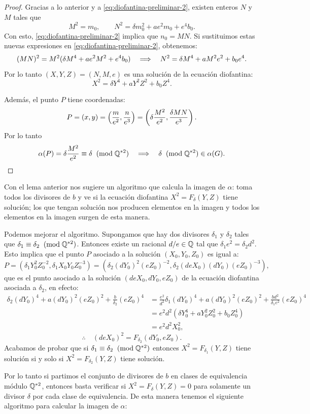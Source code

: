 \documentclass[../../tesis_maestria]{subfiles}
\begin{document}
\begin{proof}
Gracias a lo anterior y a \eqref{eq:diofantina-preliminar-2}, existen enteros $N$ y $M$ tales que
\[
	M^2=m_0,\qquad N^2=\delta m_0^2+ae^2m_0+e^4b_0.
\]
Con esto, \eqref{eq:diofantina-preliminar-2} implica que $n_0=MN$. Si sustituimos estas nuevas expresiones en \eqref{eq:diofantina-preliminar-2}, obtenemos:
\[
	(MN)^2=M^2(\delta M^4+ae^2M^2+e^4b_0)\quad\Longrightarrow\quad N^2=\delta M^4+aM^2e^2+b_0e^4.
\]
Por lo tanto  $(X,Y,Z)=(N,M,e)$ es una solución de la ecuación diofantina:
\[
	X^2=\delta Y^4+aY^2Z^2+b_0 Z^4.
\]

Además, el punto $P$ tiene coordenadas:
\[
	P=(x,y)=\left( \frac{m}{e^2},\frac{n}{e^3} \right)=\left( \delta\frac{M^2}{e^2},\frac{\delta MN}{e^3} \right).
\]
Por lo tanto
\[
	\alpha(P)=\delta\frac{M^2}{e^2}\equiv \delta\;\;(\mathrm{mod}\; \mathbb{Q}^{*2}) \quad\Longrightarrow\quad \delta\;\;(\mathrm{mod}\; \mathbb{Q}^{*2})\in\alpha(G).
\]
\end{proof}

Con el lema anterior nos sugiere un algoritmo que calcula la imagen de $\alpha$: toma todos los divisores de $b$ y ve si la ecuación diofantina $X^2=F_\delta(Y,Z)$ tiene solución; los que tengan solución nos producen elementos en la imagen y todos los elementos en la imagen surgen de esta manera.

Podemos mejorar el algoritmo. Supongamos que hay dos divisores $\delta_1$ y $\delta_2$ tales que $\delta_1\equiv\delta_2\;\;(\mathrm{mod}\; \mathbb{Q}^{*2})$. Entonces existe un racional $d/e\in\mathbb{Q}$ tal que $\delta_1 e^2=\delta_2 d^2$. Esto implica que el punto $P$ asociado a la solución $(X_0,Y_0,Z_0)$ es igual a:
	\[
		P=(\delta_1 Y_0^2Z_0^{-2},\delta_1 X_0Y_0Z_0^{-3})=(\delta_2 (dY_0)^2(eZ_0)^{-2},\delta_2 (deX_0)(dY_0)(eZ_0)^{-3}),
	\]
que es el punto asociado a la solución $(deX_0,dY_0,eZ_0)$ de la ecuación diofantina asociada a $\delta_2$, en efecto:
	\begin{align*}
		\delta_2(d Y_0)^4+a(d Y_0)^2(eZ_0)^2+\frac{b}{\delta_2}(eZ_0)^4
		&=\frac{e^2}{d^2}\delta_1(d Y_0)^4+a(d Y_0)^2(eZ_0)^2+\frac{b d^2}{\delta_1 e^2}(eZ_0)^4\\
		&=e^2d^2 (\delta Y_0^4+aY_0^2 Z_0^2+b_0Z_0^4)\\
		&=e^2d^2X_0^2,
	\end{align*}
	\[
		\therefore\quad (deX_0)^2=F_{\delta_2}(dY_0,eZ_0).
	\]
Acabamos de probar que si $\delta_1\equiv\delta_2\;\;(\mathrm{mod}\; \mathbb{Q}^{*2})$ entonces $X^2=F_{\delta_1}(Y,Z)$ tiene solución si y solo si $X^2=F_{\delta_2}(Y,Z)$ tiene solución.

Por lo tanto si partimos el conjunto de divisores de $b$ en clases de equivalencia módulo $\mathbb{Q}^{*2}$, entonces basta verificar si $X^2=F_\delta(Y,Z)=0$ para solamente un divisor $\delta$ por cada clase de equivalencia. De esta manera tenemos el siguiente algoritmo para calcular la imagen de $\alpha$:
\end{document}
